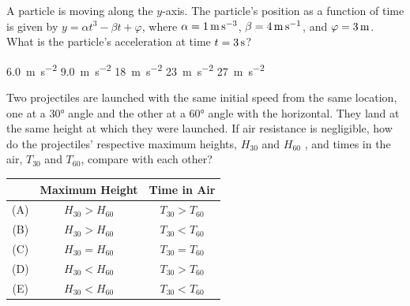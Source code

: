 \documentclass[12pt]{../../oss-apphys-exam}
\begin{document}
\begin{questions}

  \question A particle is moving along the $y$-axis. The particle's position as
  a function of time is given by $y=\alpha t^3-\beta t+\varphi$, where
  $\alpha=\SI1{\metre\per\second\cubed}$, $\beta=\SI4{\metre\per\second}$, and
  $\varphi=\SI3\metre$. What is the particle's acceleration at time
  $t=\SI3\second$?
  \begin{choices}
    \choice\SI{6.0}{\metre\per\second\squared}
    \choice\SI{9.0}{\metre\per\second\squared}
    \choice\SI{18}{\metre\per\second\squared}
    \choice\SI{23}{\metre\per\second\squared}
    \choice\SI{27}{\metre\per\second\squared}
  \end{choices}
  \newpage
  
  \question Two projectiles are launched with the same initial speed from the
  same location, one at a \ang{30} angle and the other at a \ang{60} angle with
  the horizontal. They land at the same height at which they were launched. If
  air resistance is negligible, how do the projectiles' respective maximum
  heights, $H_{30}$ and $H_{60}$ , and times in the air, $T_{30}$ and $T_{60}$,
  compare with each other?

  \begin{tabular}{ccc}
    & Maximum Height & Time in Air \\ \hline
    (A) & $H_{30} > H_{60}$ & $T_{30} > T_{60}$ \\
    (B) & $H_{30} > H_{60}$ & $T_{30} < T_{60}$ \\
    (C) & $H_{30} = H_{60}$ & $T_{30} = T_{60}$ \\
    (D) & $H_{30} < H_{60}$ & $T_{30} > T_{60}$ \\
    (E) & $H_{30} < H_{60}$ & $T_{30} < T_{60}$
  \end{tabular}
  \newpage
  


\end{questions}
\end{document}
